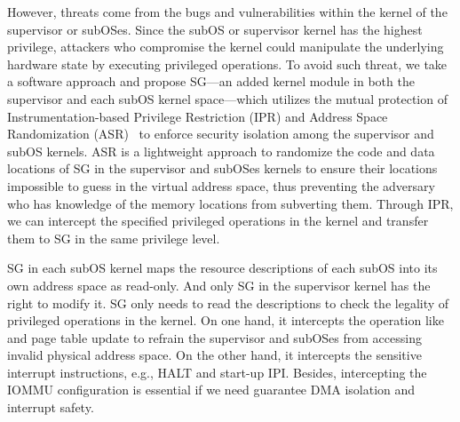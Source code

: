 \documentclass[pageno]{jpaper}
\begin{document}
However,  threats come from the bugs and vulnerabilities within the kernel of the supervisor or subOSes. Since the subOS or supervisor kernel has the highest privilege, attackers who compromise the kernel could manipulate the underlying hardware state  by executing privileged operations.
To avoid such threat, we take a software approach
and propose SG---an added kernel module in both the supervisor and each subOS kernel space---which  utilizes the mutual protection of Instrumentation-based Privilege Restriction (IPR) and Address Space Randomization (ASR)~\cite{Deng:2017:DWT} to enforce security isolation among the supervisor and subOS kernels.
ASR is a lightweight approach to randomize the code and data locations of SG in the supervisor and subOSes kernels  to ensure their locations impossible to guess in the virtual address space, thus preventing the adversary who has knowledge of the memory locations from subverting them.
Through IPR, we can intercept the specified privileged operations in the kernel and transfer them to SG in the same privilege level.








SG in each subOS kernel maps the resource descriptions of each subOS into its own address space as read-only. And only SG in the supervisor kernel has the right to modify it. SG only needs to read the descriptions to check the legality of privileged operations in the kernel. On one hand, it intercepts the operation like  and page table update to refrain the supervisor and subOSes from accessing invalid physical address space.
On the other hand, it intercepts the sensitive interrupt instructions, e.g., HALT and start-up IPI. Besides, intercepting the IOMMU configuration is essential if we need guarantee DMA isolation and interrupt safety.
\end{document}
